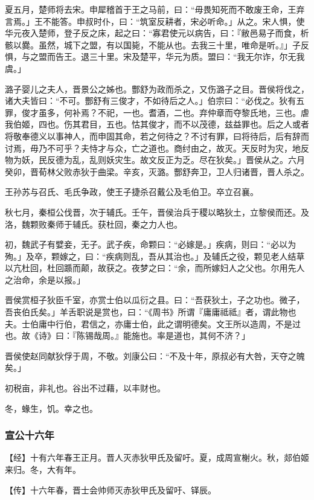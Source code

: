 \documentclass[]{article}
\begin{document}
夏五月，楚师将去宋。申犀稽首于王之马前，曰：``毋畏知死而不敢废王命，王弃言焉。」王不能答。申叔时仆，曰：``筑室反耕者，宋必听命。」从之。宋人惧，使华元夜入楚师，登子反之床，起之曰：``寡君使元以病告，曰：『敝邑易子而食，析骸以爨。虽然，城下之盟，有以国毙，不能从也。去我三十里，唯命是听。』」子反惧，与之盟而告王。退三十里。宋及楚平，华元为质。盟曰：``我无尔诈，尔无我虞。」

潞子婴儿之夫人，晋景公之姊也。酆舒为政而杀之，又伤潞子之目。晋侯将伐之，诸大夫皆曰：``不可。酆舒有三俊才，不如待后之人。」伯宗曰：``必伐之。狄有五罪，俊才虽多，何补焉？不祀，一也。耆酒，二也。弃仲章而夺黎氏地，三也。虐我伯姬，四也。伤其君目，五也。怙其俊才，而不以茂德，兹益罪也。后之人或者将敬奉德义以事神人，而申固其命，若之何待之？不讨有罪，曰将待后，后有辞而讨焉，毋乃不可乎？夫恃才与众，亡之道也。商纣由之，故灭。天反时为灾，地反物为妖，民反德为乱，乱则妖灾生。故文反正为乏。尽在狄矣。」晋侯从之。六月癸卯，晋荀林父败赤狄于曲梁。辛亥，灭潞。酆舒奔卫，卫人归诸晋，晋人杀之。

王孙苏与召氏、毛氏争政，使王子捷杀召戴公及毛伯卫。卒立召襄。

秋七月，秦桓公伐晋，次于辅氏。壬午，晋侯治兵于稷以略狄土，立黎侯而还。及洛，魏颗败秦师于辅氏。获杜回，秦之力人也。

初，魏武子有嬖妾，无子。武子疾，命颗曰：``必嫁是。」疾病，则曰：``必以为殉。」及卒，颗嫁之，曰：``疾病则乱，吾从其治也。」及辅氏之役，颗见老人结草以亢杜回，杜回踬而颠，故获之。夜梦之曰：``余，而所嫁妇人之父也。尔用先人之治命，余是以报。」

晋侯赏桓子狄臣千室，亦赏士伯以瓜衍之县。曰：``吾获狄土，子之功也。微子，吾丧伯氏矣。」羊舌职说是赏也，曰：``《周书》所谓『庸庸祗祗』者，谓此物也夫。士伯庸中行伯，君信之，亦庸士伯，此之谓明德矣。文王所以造周，不是过也。故《诗》曰：『陈锡哉周。』能施也。率是道也，其何不济？」

晋侯使赵同献狄俘于周，不敬。刘康公曰：``不及十年，原叔必有大咎，天夺之魄矣。」

初税亩，非礼也。谷出不过藉，以丰财也。

冬，蝝生，饥。幸之也。

\hypertarget{header-n1481}{%
\subsubsection{宣公十六年}\label{header-n1481}}

【经】十有六年春王正月。晋人灭赤狄甲氏及留吁。夏，成周宣榭火。秋，郯伯姬来归。冬，大有年。

【传】十六年春，晋士会帅师灭赤狄甲氏及留吁、铎辰。
\end{document}
